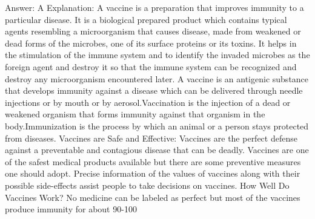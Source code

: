 Answer: A
Explanation: A vaccine is a preparation that improves immunity to a particular disease. It is a biological prepared product which contains typical agents resembling a microorganism that causes disease, made from weakened or dead forms of the microbes, one of its surface proteins or its toxins. It helps in the stimulation of the immune system and to identify the invaded microbes as the foreign agent and destroy it so that the immune system can be recognized and destroy any microorganism encountered later. A vaccine is an antigenic substance that develops immunity against a disease which can be delivered through needle injections or by mouth or by aerosol.Vaccination is the injection of a dead or weakened organism that forms immunity against that organism in the body.Immunization is the process by which an animal or a person stays protected from diseases. Vaccines are Safe and Effective: Vaccines are the perfect defense against a preventable and contagious disease that can be deadly. Vaccines are one of the safest medical products available but there are some preventive measures one should adopt. Precise information of the values of vaccines along with their possible side-effects assist people to take decisions on vaccines. How Well Do Vaccines Work? No medicine can be labeled as perfect but most of the vaccines produce immunity for about 90-100%

